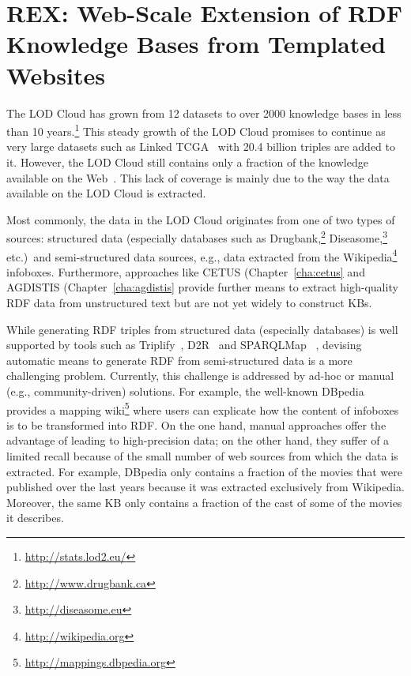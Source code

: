 \chapter{REX: Web-Scale Extension of RDF Knowledge Bases from Templated Websites}
\label{cha:rex}



The \ac{LOD} Cloud has grown from 12 datasets to over 2000 knowledge bases in less than 10 years.\footnote{\url{http://stats.lod2.eu/}}
This steady growth of the \ac{LOD} Cloud promises to continue as very large datasets such as  Linked TCGA~\cite{SAL+13a} with 20.4 billion triples are added to it. 
However, the \ac{LOD} Cloud still contains only a fraction of the knowledge available on the Web~\cite{GER+13}. 
This lack of coverage is mainly due to the way the data available on the \ac{LOD} Cloud is extracted. 

Most commonly, the data in the \ac{LOD} Cloud originates from one of two types of sources: structured data (especially databases such as Drugbank,\footnote{\url{http://www.drugbank.ca}} Diseasome,\footnote{\url{http://diseasome.eu}} etc.)~and semi-structured data sources, e.g., data extracted from the Wikipedia\footnote{\url{http://wikipedia.org}} infoboxes. 
Furthermore, approaches like CETUS (Chapter~\ref{cha:cetus} and  AGDISTIS (Chapter~\ref{cha:agdistis} provide further means to extract high-quality \ac{RDF} data from unstructured text but are not yet widely to construct \ac{KB}s.

While generating \ac{RDF} triples from structured data (especially databases) is well supported by tools such as Triplify~\cite{triplify_www}, D2R~\cite{Bizer04} and SPARQLMap~\cite{unbehauen-jist-2012-sparqlmap}
, devising automatic means to generate \ac{RDF} from semi-structured data is a more challenging  problem. 
Currently, this challenge is addressed by ad-hoc or manual (e.g., community-driven) solutions. 
For example, the well-known DBpedia~\cite{dbpedia-swj} provides a mapping wiki\footnote{\url{http://mappings.dbpedia.org}} where users can explicate how the content of infoboxes is to be transformed into \ac{RDF}. 
On the one hand, manual approaches offer the advantage of leading to high-precision data; on the other hand, they suffer of a limited recall because of the small number of web sources from which the data is extracted. 
For example, DBpedia only contains a fraction of the movies that were published over the last years because it was extracted exclusively from Wikipedia.
Moreover, the same  \ac{KB} only contains a fraction of the cast of some of the movies it describes.

